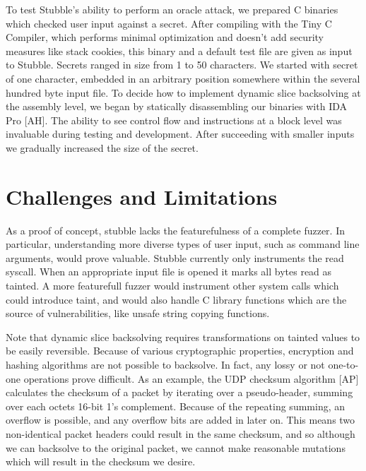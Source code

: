 \documentclass[11pt,expanded,copyright]{fsuthesis}
\begin{document}
To test Stubble's ability to perform an oracle attack, we prepared C binaries which checked user input against a secret. After compiling with the Tiny C Compiler, which performs minimal optimization and doesn't add security measures like stack cookies, this binary and a default test file are given as input to Stubble. Secrets ranged in size from 1 to 50 characters. We started with secret of one character, embedded in an arbitrary position somewhere within the several hundred byte input file. To decide how to implement dynamic slice backsolving at the assembly level, we began by statically disassembling our binaries with IDA Pro [AH]. The ability to see control flow and instructions at a block level was invaluable during testing and development. After succeeding with smaller inputs we gradually increased the size of the secret.

\section{Challenges and Limitations}

As a proof of concept, stubble lacks the featurefulness of a complete fuzzer. In particular, understanding more diverse types of user input, such as command line arguments, would prove valuable. Stubble currently only instruments the read syscall. When an appropriate input file is opened it marks all bytes read as tainted. A more featurefull fuzzer would instrument other system calls which could introduce taint, and would also handle C library functions which are the source of vulnerabilities, like unsafe string copying functions.

Note that dynamic slice backsolving requires transformations on tainted values to be easily reversible. Because of various cryptographic properties, encryption and hashing algorithms are not possible to backsolve. In fact, any lossy or not one-to-one operations prove difficult. As an example, the UDP checksum algorithm [AP] calculates the checksum of a packet by iterating over a pseudo-header, summing over each octets 16-bit 1's complement. Because of the repeating summing, an overflow is possible, and any overflow bits are added in later on. This means two non-identical packet headers could result in the same checksum, and so although we can backsolve to the original packet, we cannot make reasonable mutations which will result in the checksum we desire.

\end{document}
